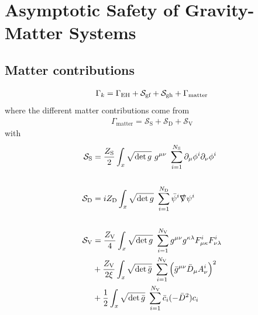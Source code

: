 \chapter{Asymptotic Safety of Gravity-Matter Systems}
\blindtext
\section{Matter contributions}
\begin{align}
	\Gamma_{k} = \Gamma_{\text{EH}} + \mathcal{S}_{\text{gf}}+ \mathcal{S}_{\text{gh}}+ \Gamma_{\text{matter}}
\end{align}
where the different matter contributions come from
\begin{align}
	\Gamma_{\text{matter}} = \mathcal{S}_{\text{S}} + \mathcal{S}_{\text{D}} + \mathcal{S}_{\text{V}} 
\end{align}
with 
\begin{align}
	\mathcal{S}_{\text{S}} &= \frac{Z_{\text{S}}}{2}\int_x \sqrt{\operatorname{det}g} \ g^{\mu\nu} \ \sum\limits_{i=1}^{N_{\text{S}}} \partial_{\mu}\phi^{i}\partial_{\nu}\phi^{i} \\
	\phantom{.}\nonumber\\
	\mathcal{S}_{\text{D}} &= iZ_{\text{D}}\int_x \sqrt{\operatorname{det}g} \ \sum\limits_{i=1}^{N_{\text{D}}} \bar{\psi}^{i}\slashed{\nabla}\psi^{i}\\
	\phantom{.}\nonumber\\
		\mathcal{S}_{\text{V}} &= \frac{Z_{\text{V}}}{4}\int_x \sqrt{\operatorname{det}g} \ \sum\limits_{i=1}^{N_{\text{V}}} g^{\mu\nu}g^{\kappa\lambda}F^{i}_{\mu\kappa}F^{i}_{\nu\lambda} \nonumber \\
		&+ \frac{Z_{\text{V}}}{2\xi}\int_x \sqrt{\operatorname{det}\bar{g}} \ \sum\limits_{i=1}^{N_{\text{V}}} \left(\bar{g}^{\mu\nu}\bar{D}_{\mu}A_{\nu}^{i}\right)^2  \\
		&+ \frac{1}{2}\int_x \sqrt{\operatorname{det}\bar{g}} \ \sum\limits_{i=1}^{N_{\text{V}}} \bar{c}_i(-\bar{D}^2)c_i \nonumber
\end{align}
